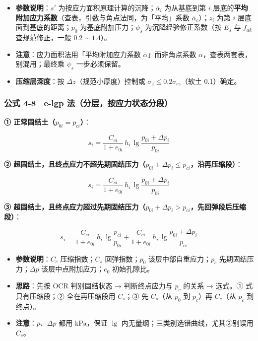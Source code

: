 \documentclass[
]{article}
\providecommand{\tightlist}{%
  \setlength{\itemsep}{0pt}\setlength{\parskip}{0pt}}
\begin{document}
\begin{itemize}
\tightlist
\item
  \textbf{参数说明}：\(s'\)
  为按应力面积原理计算的沉降；\(\bar{\alpha}_i\) 为从基底到第 \(i\)
  层底的\textbf{平均附加应力系数}（查表，引数与角点法同，为「平均」系数
  \(\bar\alpha_c\)）；\(z_i\) 为第 \(i\) 层底面到基底的距离；\(p_0\)
  为基底附加压力；\(\psi_s\) 为沉降经验修正系数（按 \(E_s\) 与
  \(f_{ak}\) 查规范修正，一般 \(0.2\sim1.4\)）。
\item
  \textbf{注意}：应力面积法用「平均附加应力系数
  \(\bar\alpha\)」而非角点系数 \(\alpha\)，查表两套表，别混用；最终乘
  \(\psi_s\) 一步必须保留。
\item
  \textbf{压缩层深度}：按 \(\Delta z\)（规范小厚度）控制或
  \(\sigma_{z}\le0.2\sigma_{cz}\)（软土 0.1）确定。
\end{itemize}

\subsubsection{公式 4-8　e-lgp
法（分层，按应力状态分段）}\label{ux516cux5f0f-4-8-e-lgp-ux6cd5ux5206ux5c42ux6309ux5e94ux529bux72b6ux6001ux5206ux6bb5}

\textbf{① 正常固结土（\(p_{0i}=p_{ci}\)）}：

\[s_i=\frac{C_{ci}}{1+e_{0i}}\,h_i\,\lg\frac{p_{0i}+\Delta p_i}{p_{0i}}\]

\textbf{②
超固结土，且终点应力不超先期固结压力（\(p_{0i}+\Delta p_i\le p_{ci}\)，沿再压缩段）}：

\[s_i=\frac{C_{si}}{1+e_{0i}}\,h_i\,\lg\frac{p_{0i}+\Delta p_i}{p_{0i}}\]

\textbf{③
超固结土，且终点应力超过先期固结压力（\(p_{0i}+\Delta p_i>p_{ci}\)，先回弹段后压缩段）}：

\[s_i=\frac{C_{si}}{1+e_{0i}}\,h_i\,\lg\frac{p_{ci}}{p_{0i}}+\frac{C_{ci}}{1+e_{0i}}\,h_i\,\lg\frac{p_{0i}+\Delta p_i}{p_{ci}}\]

\begin{itemize}
\tightlist
\item
  \textbf{参数说明}：\(C_c\) 压缩指数；\(C_s\) 回弹指数；\(p_0\)
  该层中部自重应力；\(p_c\) 先期固结压力；\(\Delta p\)
  该层中点附加应力；\(e_0\) 初始孔隙比。
\item
  \textbf{思路}：先按 OCR 判别固结状态 → 判断终点应力与 \(p_c\) 的关系 →
  选式。① 式只有压缩段；② 全在再压缩段用 \(C_s\)；③ 先 \(C_s\)（从
  \(p_0\) 到 \(p_c\)）再 \(C_c\)（从 \(p_c\) 到终点）。
\item
  \textbf{注意}：\(p\)、\(\Delta p\) 都用 \(\mathrm{kPa}\)，保证 \(\lg\)
  内无量纲；三类别选错曲线，尤其②别误用 \(C_c\)。
\end{itemize}
\end{document}
